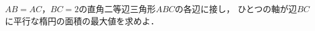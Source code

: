 \documentclass[../../main.tex]{subfiles}
\begin{document}
$AB=AC$，$BC=2$の直角二等辺三角形$ABC$の各辺に接し，
ひとつの軸が辺$BC$に平行な楕円の面積の最大値を求めよ．
\end{document}

